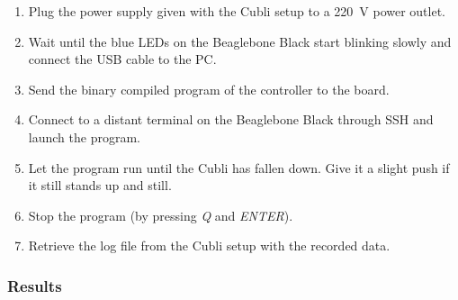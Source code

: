 \begin{enumerate}
  \item Plug the power supply given with the Cubli setup to a \SI{220}{V} power outlet.
  \item Wait until the blue LEDs on the Beaglebone Black start blinking slowly and connect the USB cable to the PC.
  \item Send the binary compiled program of the controller to the board.
  \item Connect to a distant terminal on the Beaglebone Black through SSH and launch the program.
  \item Let the program run until the Cubli has fallen down. Give it a slight push if it still stands up and still.
  \item Stop the program (by pressing \textit{Q} and \textit{ENTER}).
  \item Retrieve the log file from the Cubli setup with the recorded data.
\end{enumerate}

\subsubsection{Results}

